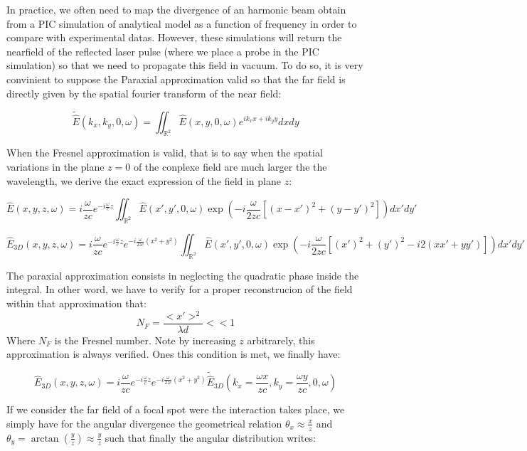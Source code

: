 In practice, we often need to map the divergence of an harmonic beam obtain from a PIC simulation of analytical model as a function of frequency in order to compare with experimental datas. However, these simulations will return the nearfield of the reflected laser pulse (where we place a probe in the PIC simulation) so that we need to propagate this field in vacuum. To do so, it is very convinient to suppose the Paraxial approximation valid so that the far field is directly given by the spatial fourier transform of the near field:

\begin{equation}
\tilde{\hat{E}}(k_x,k_y,0,\omega) = \iint_{\mathbb{R}^2}\hat{E}(x,y,0,\omega)e^{ik_xx+ik_yy}dxdy
\end{equation}

When the Fresnel approximation is valid, that is to say when the spatial variations in the plane $z=0$ of the conplexe field are much larger the the wavelength, we derive the exact expression of the field in plane $z$:

\begin{equation}
\hat{E}(x,y,z,\omega) =i\frac{\omega}{z c}e^{-i\frac{\omega}{c}z}\iint_{\mathbb{R}^2}\hat{E}(x',y',0,\omega)\exp(-i\frac{\omega}{2zc}[(x-x')^2+(y-y')^2])dx'dy'
\end{equation}


\begin{equation}
\hat{E}_{3D}(x,y,z,\omega) =i\frac{\omega}{z c}e^{-i\frac{\omega}{c}z}e^{-i\frac{\omega}{2zc}(x^2+y^2)}\iint_{\mathbb{R}^2}\hat{E}(x',y',0,\omega)\exp(-i\frac{\omega}{2zc}[(x')^2+(y')^2-i2(xx'+yy')])dx'dy'
\end{equation}

The paraxial approximation consists in neglecting the quadratic phase inside the integral. In other word, we have to verify for a proper reconstrucion of the field within that approximation that:
$$
N_F = \frac{<x'>^2}{\lambda d} <<1
$$
Where $N_F$ is the Fresnel number. Note by increasing $z$ arbitrarely, this approximation is always verified. Ones this condition is met, we finally have:

\begin{equation}
\hat{E}_{3D}(x,y,z,\omega) =i\frac{\omega}{z c}e^{-i\frac{\omega}{c}z}e^{-i\frac{\omega}{2zc}(x^2+y^2)}\tilde{\hat{E}}_{3D}(k_x = \frac{\omega x}{zc},k_y=\frac{\omega y}{zc},0,\omega)
\end{equation}

If we consider the far field of a focal spot were the interaction takes place, we simply have for the angular divergence the geometrical relation $\theta_x \approx \frac{x}{z}$ and $\theta_y = \arctan(\frac{y}{z})\approx \frac{y}{z}$ such that finally the angular distribution writes:


